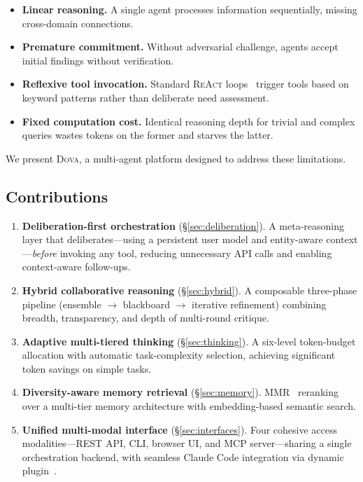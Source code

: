 \documentclass{article}
\theoremstyle{plain}
\theoremstyle{definition}
\newcommand{\dova}{\textsc{Dova}}
\newcommand{\react}{\textsc{ReAct}}
\begin{document}
\begin{itemize}
  \item \textbf{Linear reasoning.}  A single agent processes information
    sequentially, missing cross-domain connections.
  \item \textbf{Premature commitment.}  Without adversarial challenge, agents
    accept initial findings without verification.
  \item \textbf{Reflexive tool invocation.}  Standard \react{}
    loops~\citep{yao2023react} trigger tools based on keyword patterns rather
    than deliberate need assessment.
  \item \textbf{Fixed computation cost.}  Identical reasoning depth for trivial
    and complex queries wastes tokens on the former and starves the latter.
\end{itemize}

We present \dova{}, a multi-agent platform designed to address these
limitations.

\subsection{Contributions}

\begin{enumerate}
  \item \textbf{Deliberation-first orchestration} (\S\ref{sec:deliberation}).
    A meta-reasoning layer that deliberates---using a persistent user model
    and entity-aware context---\emph{before} invoking any tool, reducing
    unnecessary API calls and enabling context-aware follow-ups.

  \item \textbf{Hybrid collaborative reasoning}
    (\S\ref{sec:hybrid}).  A composable three-phase pipeline
    (ensemble $\to$ blackboard $\to$ iterative refinement) combining breadth,
    transparency, and depth of multi-round critique.

  \item \textbf{Adaptive multi-tiered thinking} (\S\ref{sec:thinking}).
    A six-level token-budget allocation with automatic task-complexity
    selection, achieving significant token savings on simple tasks.

  \item \textbf{Diversity-aware memory retrieval} (\S\ref{sec:memory}).
    MMR~\citep{carbonell1998mmr} reranking over a multi-tier memory
    architecture with embedding-based semantic search.

  \item \textbf{Unified multi-modal interface} (\S\ref{sec:interfaces}).
    Four cohesive access modalities---REST API, CLI, browser UI,
    and MCP server---sharing a single orchestration backend, with seamless
    Claude Code integration via dynamic plugin~\citep{anthropic2024mcp}.
\end{enumerate}
\end{document}
